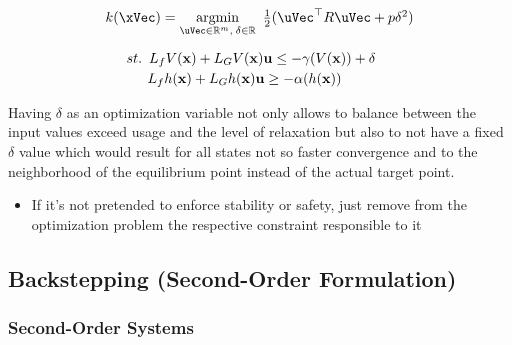 \begin{equation}
    \begin{array}{l}
        k(\xVec) = \underset{\uVec \in \mathbb{R}^m, \hspace{0.2em} \delta \in \mathbb{R}}{\mathrm{argmin}} \quad \hspace{-0.5em} \frac{1}{2} (\uVec^\top R \uVec + p\delta^2 ) \vspace{1em} \\ 
        \quad \hspace{0.5em}  st. \hspace{0.5em} L_fV(\mathbf{x}) + L_GV(\mathbf{x})\mathbf{u} \leq -\gamma(V(\mathbf{x})) + \delta \vspace{0.25em}\\
        \quad \quad \hspace{1em} L_fh(\mathbf{x}) + L_Gh(\mathbf{x})\mathbf{u} \geq -\alpha(h(\mathbf{x}))
    \end{array}
 \label{eq:CLF-CBF-QP-relaxed}
\end{equation}

Having \(\delta\) as an optimization variable not only allows to balance between the input values exceed usage and the level of relaxation but also to not have a fixed \(\delta\) value which would result for all states not so faster convergence and to the neighborhood of the equilibrium point instead of the actual target point. \\

\begin{tcolorbox}[colback=blue!5!white,colframe=blue!35!white,title=Notes:]
\begin{itemize}
    \item If it's not pretended to enforce stability or safety, just remove from the optimization problem the respective constraint responsible to it
\end{itemize}
\end{tcolorbox}

\newpage %


\subsection{Backstepping (Second-Order Formulation)}
\label{sub:backstepping}

\subsubsection{Second-Order Systems}
\label{subsub:higher_order_systems}

